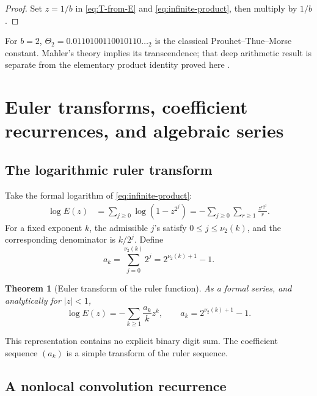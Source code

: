 \documentclass[11pt,oneside]{article}
\numberwithin{equation}{section}
\newtheorem{theorem}{Theorem}[section]
\theoremstyle{definition}
\theoremstyle{remark}
\newcommand{\vtwo}{\nu_2}
\begin{document}
\begin{proof}
Set \(z=1/b\) in \eqref{eq:T-from-E} and
\eqref{eq:infinite-product}, then multiply by \(1/b\).
\end{proof}

For \(b=2\), \(\Theta_2=0.0110100110010110\ldots{}_2\) is the classical
Prouhet--Thue--Morse constant.  Mahler's theory implies its transcendence; that
deep arithmetic result is separate from the elementary product identity
proved here \cite{mahler1929,alloucheShallit2003}.

\section[Euler transforms and algebraic series]{Euler transforms, coefficient recurrences, and algebraic series}
\label{sec:euler}

\subsection{The logarithmic ruler transform}

Take the formal logarithm of \eqref{eq:infinite-product}:
\begin{align}
 \log E(z)
 &=\sum_{j\ge0}\log(1-z^{2^j})
  =-\sum_{j\ge0}\sum_{r\ge1}\frac{z^{r2^j}}r.
  \label{eq:log-E-double}
\end{align}
For a fixed exponent \(k\), the admissible \(j\)'s satisfy
\(0\le j\le\vtwo(k)\), and the corresponding denominator is \(k/2^j\).
Define
\begin{equation}
  a_k=\sum_{j=0}^{\vtwo(k)}2^j
      =2^{\vtwo(k)+1}-1.
  \label{eq:ak-definition}
\end{equation}

\begin{theorem}[Euler transform of the ruler function]
\label{thm:log-E}
As a formal series, and analytically for \(|z|<1\),
\begin{equation}
  \boxed{
  \log E(z)=-\sum_{k\ge1}\frac{a_k}{k}z^k,
  \qquad a_k=2^{\vtwo(k)+1}-1.}
  \label{eq:log-E}
\end{equation}
\end{theorem}

This representation contains no explicit binary digit sum.  The coefficient
sequence \((a_k)\) is a simple transform of the ruler sequence.

\subsection{A nonlocal convolution recurrence}
\end{document}
